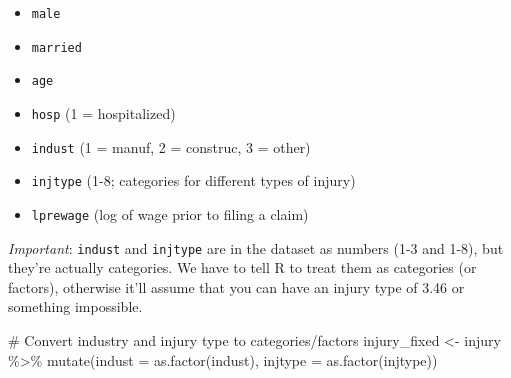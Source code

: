 \documentclass[
  letterpaper,
  DIV=11,
  numbers=noendperiod]{scrartcl}
\newenvironment{Shaded}{\begin{snugshade}}{\end{snugshade}}
\newcommand{\AttributeTok}[1]{\textcolor[rgb]{0.40,0.45,0.13}{#1}}
\newcommand{\CommentTok}[1]{\textcolor[rgb]{0.37,0.37,0.37}{#1}}
\newcommand{\FunctionTok}[1]{\textcolor[rgb]{0.28,0.35,0.67}{#1}}
\newcommand{\NormalTok}[1]{\textcolor[rgb]{0.00,0.23,0.31}{#1}}
\newcommand{\OtherTok}[1]{\textcolor[rgb]{0.00,0.23,0.31}{#1}}
\newcommand{\SpecialCharTok}[1]{\textcolor[rgb]{0.37,0.37,0.37}{#1}}
\providecommand{\tightlist}{%
  \setlength{\itemsep}{0pt}\setlength{\parskip}{0pt}}\usepackage{longtable,booktabs,array}
\begin{document}
\begin{itemize}
\tightlist
\item
  \texttt{male}
\item
  \texttt{married}
\item
  \texttt{age}
\item
  \texttt{hosp} (1 = hospitalized)
\item
  \texttt{indust} (1 = manuf, 2 = construc, 3 = other)
\item
  \texttt{injtype} (1-8; categories for different types of injury)
\item
  \texttt{lprewage} (log of wage prior to filing a claim)
\end{itemize}

\emph{Important}: \texttt{indust} and \texttt{injtype} are in the
dataset as numbers (1-3 and 1-8), but they're actually categories. We
have to tell R to treat them as categories (or factors), otherwise it'll
assume that you can have an injury type of 3.46 or something impossible.

\begin{Shaded}
\begin{Highlighting}[]
\CommentTok{\# Convert industry and injury type to categories/factors}
\NormalTok{injury\_fixed }\OtherTok{\textless{}{-}}\NormalTok{ injury }\SpecialCharTok{\%\textgreater{}\%}
  \FunctionTok{mutate}\NormalTok{(}\AttributeTok{indust =} \FunctionTok{as.factor}\NormalTok{(indust),}
         \AttributeTok{injtype =} \FunctionTok{as.factor}\NormalTok{(injtype))}
\end{Highlighting}
\end{Shaded}
\end{document}
